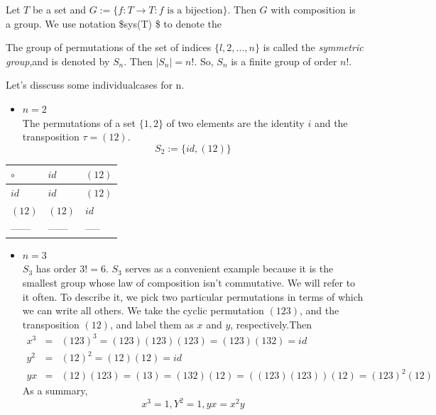 \documentclass[
]{book}
\providecommand{\tightlist}{%
  \setlength{\itemsep}{0pt}\setlength{\parskip}{0pt}}
\begin{document}
\leavevmode{}%
Let \(T\) be a set and \(G:=\{f:T\to T: f \text{ is a bijection}\}\).
Then \(G\) with composition is a group. We use notation \$sys(T) \$ to
denote the

\leavevmode{}%
The group of permutations of the set of indices \(\{l, 2, ... , n\}\) is
called the \emph{symmetric group},and is denoted by \(S_n\). Then
\(|S_n|=n !\). So, \(S_n\) is a finite group of order \(n!\).

Let's disscuss some individualcases for n.

\begin{itemize}
\tightlist
\item
  \textbf{\(n=2\)}\\
  The permutations of a set \(\{1, 2\}\) of two elements are the
  identity \(i\) and the transposition \(\tau=(12)\).
  \[S_2:=\{id,(12)\}\]
\end{itemize}

\begin{longtable}[]{@{}lll@{}}
\toprule\noalign{}
\(\circ\) & \(id\) & \((12)\) \\
\midrule\noalign{}
\endhead
\bottomrule\noalign{}
\endlastfoot
\(id\) & \(id\) & \((12)\) \\
\((12)\) & \((12)\) & \(id\) \\
------ & ------ & ----- \\
\end{longtable}

\begin{itemize}
\tightlist
\item
  \(n=3\)\\
  \(S_3\) has order \(3!=6\). \(S_3\) serves as a convenient example
  because it is the smallest group whose law of composition isn't
  commutative. We will refer to it often. To describe it, we pick two
  particular permutations in terms of which we can write all others. We
  take the cyclic permutation \((123)\), and the transposition \((12)\),
  and label them as \(x\) and \(y\), respectively.Then \begin{eqnarray}
  x^3 &=& (123)^3=(123)(123)(123)=(123)(132)=id\\
  y^2 &=& (12)^2=(12)(12)=id\\
  yx  &=& (12)(123)=(13)=(132)(12)=((123)(123))(12)=(123)^2(12)
  \end{eqnarray} As a summary, \[x^3=1,Y^2=1,yx=x^2y\]
\end{itemize}
\end{document}
